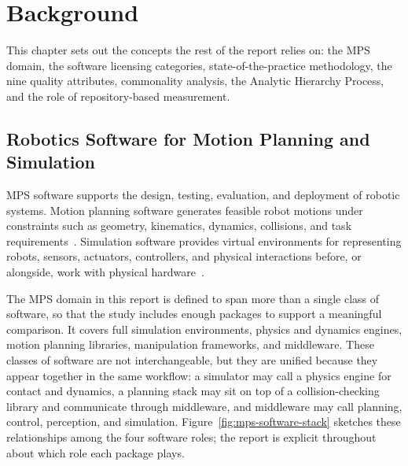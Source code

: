 \chapter{Background}
\label{ch:background}

This chapter sets out the concepts the rest of the report relies on: the MPS domain, the software licensing categories, state-of-the-practice methodology, the nine quality attributes, commonality analysis, the Analytic Hierarchy Process, and the role of repository-based measurement.

\section{Robotics Software for Motion Planning and Simulation}
\label{sec:robotics-software-background}

MPS software supports the design, testing, evaluation, and deployment of robotic systems. Motion planning software generates feasible robot motions under constraints such as geometry, kinematics, dynamics, collisions, and task requirements~\citep{lavalle2006planning}. Simulation software provides virtual environments for representing robots, sensors, actuators, controllers, and physical interactions before, or alongside, work with physical hardware~\citep{collins2021simulators}.

The MPS domain in this report is defined to span more than a single class of software, so that the study includes enough packages to support a meaningful comparison. It covers full simulation environments, physics and dynamics engines, motion planning libraries, manipulation frameworks, and middleware. These classes of software are not interchangeable, but they are unified because they appear together in the same workflow: a simulator may call a physics engine for contact and dynamics, a planning stack may sit on top of a collision-checking library and communicate through middleware, and middleware may call planning, control, perception, and simulation. Figure~\ref{fig:mps-software-stack} sketches these relationships among the four software roles; the report is explicit throughout about which role each package plays.

